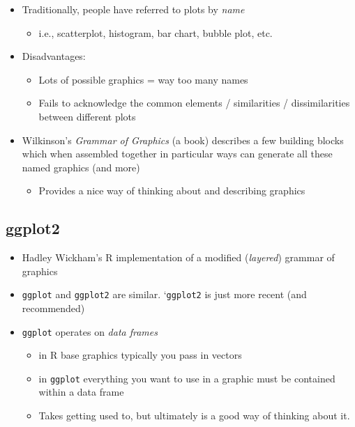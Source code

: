 \documentclass[]{book}
\providecommand{\tightlist}{%
  \setlength{\itemsep}{0pt}\setlength{\parskip}{0pt}}
\theoremstyle{definition}
\theoremstyle{definition}
\theoremstyle{remark}
\begin{document}
\begin{itemize}
\tightlist
\item
  Traditionally, people have referred to plots by \emph{name}

  \begin{itemize}
  \tightlist
  \item
    i.e., scatterplot, histogram, bar chart, bubble plot, etc.
  \end{itemize}
\item
  Disadvantages:

  \begin{itemize}
  \tightlist
  \item
    Lots of possible graphics = way too many names
  \item
    Fails to acknowledge the common elements / similarities /
    dissimilarities between different plots
  \end{itemize}
\item
  Wilkinson's \emph{Grammar of Graphics} (a book) describes a few
  building blocks which when assembled together in particular ways can
  generate all these named graphics (and more)

  \begin{itemize}
  \tightlist
  \item
    Provides a nice way of thinking about and describing graphics
  \end{itemize}
\end{itemize}

\subsection{ggplot2}\label{ggplot2}

\begin{itemize}
\tightlist
\item
  Hadley Wickham's R implementation of a modified (\emph{layered})
  grammar of graphics
\item
  \texttt{ggplot} and \texttt{ggplot2} are similar. `\texttt{ggplot2} is
  just more recent (and recommended)
\item
  \texttt{ggplot} operates on \emph{data frames}

  \begin{itemize}
  \tightlist
  \item
    in R base graphics typically you pass in vectors
  \item
    in \texttt{ggplot} everything you want to use in a graphic must be
    contained within a data frame
  \item
    Takes getting used to, but ultimately is a good way of thinking
    about it.
  \end{itemize}
\end{itemize}
\end{document}
